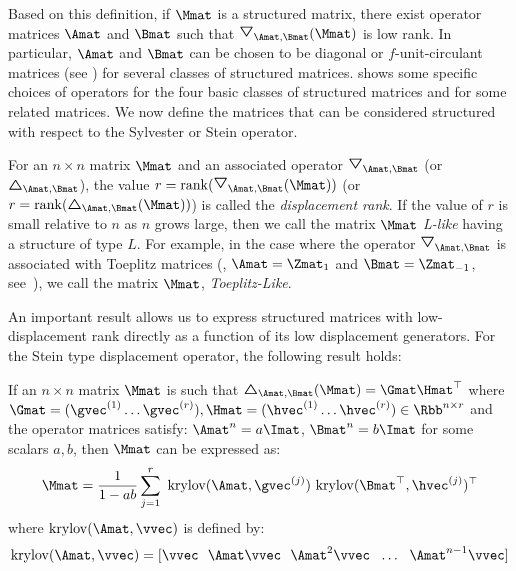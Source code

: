 \noindent
Based on this definition, if $\Mmat$ is a structured matrix, there exist operator matrices $\Amat$ and $\Bmat$ such that $\triangleopdown_{\Amat, \Bmat} (\Mmat)$ is low rank.
In particular, $\Amat$ and $\Bmat$ can be chosen to be diagonal or $f$-unit-circulant matrices (see ) for several classes of structured matrices.
 shows some specific choices of operators for the four basic classes of structured matrices and for some related matrices.
We now define the matrices that can be considered structured with respect to the Sylvester or Stein operator.
\begin{definition}
  For an $n \times n$ matrix $\Mmat$ and an associated operator $\triangleopdown_{\Amat, \Bmat}$ (or $\triangleopup_{\Amat, \Bmat}$), the value $r = \rank(\triangleopdown_{\Amat, \Bmat}(\Mmat))$ (or $r = \rank(\triangleopup_{\Amat, \Bmat}(\Mmat))$) is called the \emph{displacement rank}.
    If the value of $r$ is small relative to $n$ as $n$ grows large, then we call the matrix $\Mmat$ \emph{L-like} having a structure of type $L$.
    For example, in the case where the operator $\triangleopdown_{\Amat, \Bmat}$ is associated with Toeplitz matrices (\ie, $\Amat = \Zmat_1$ and $\Bmat = \Zmat_{-1}$, see~), we call the matrix $\Mmat$, \emph{Toeplitz-Like}.
  \label{definition:ch2-l_like_matrices}
\end{definition}

An important result allows us to express structured matrices with low-displacement rank directly as a function of its low displacement generators.
For the Stein type displacement operator, the following result holds:
\begin{theorem} \label{theorem:ch2-krylov_decomposition}
  If an $n \times n$ matrix $\Mmat$ is such that $\triangleopup_{\Amat, \Bmat}(\Mmat) = \Gmat \Hmat^\top$ where 
  $\Gmat = (\gvec^{(1)} \ldots \gvec^{(r)}), \Hmat = (\hvec^{(1)} \ldots \hvec^{(r)}) \in \Rbb^{n \times r}$ 
  and the operator matrices satisfy: $\Amat^n = a \Imat$, $\Bmat^n = b \Imat$ for some scalars $a, b$, then $\Mmat$ can be expressed as: 
  \begin{equation} \label{equation:ch2-krylov_decomposition}
    \Mmat = \frac{1}{1 - ab} \sum_{j=1}^{r} ~\krylov(\Amat, \gvec^{(j)}) ~\krylov(\Bmat^\top, \hvec^{(j)})^\top
  \end{equation}
  where $\krylov(\Amat, \vvec)$ is defined by:
  \begin{equation}
    \krylov(\Amat, \vvec) = [\vvec~~\Amat\vvec~~\Amat^2 \vvec~~\ldots~~\Amat^{n-1} \vvec]
  \end{equation}
  \removespace
\end{theorem}

